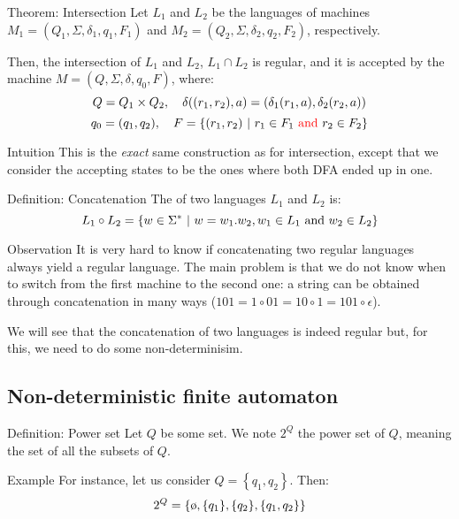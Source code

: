 \documentclass[a4paper]{article}
\begin{document}
\begin{parag}{Theorem: Intersection}
    Let $L_1$ and $L_2$ be the languages of machines $M_1 = \left(Q_1, \Sigma, \delta_1, q_1, F_1\right)$ and $M_2 = \left(Q_2, \Sigma, \delta_2, q_2, F_2\right)$, respectively.

    Then, the intersection of $L_1$ and $L_2$, $L_1 \cap L_2$ is regular, and it is accepted by the machine $M = \left(Q, \Sigma, \delta, q_0, F\right)$, where: 
    \[Q = Q_1 \times Q_2, \mathspace \delta\left(\left(r_1, r_2\right), a\right) = \left(\delta_1\left(r_1, a\right), \delta_2\left(r_2, a\right)\right) \]
    \[q_0 = \left(q_1, q_2\right), \mathspace F = \left\{\left(r_1, r_2\right) \suchthat r_1 \in F_1 \text{ \textcolor{red}{and} } r_2 \in F_2\right\}\]

    \begin{subparag}{Intuition}
        This is the \textit{exact} same construction as for intersection, except that we consider the accepting states to be the ones where both DFA ended up in one.
    \end{subparag}
\end{parag}

\begin{parag}{Definition: Concatenation}
    The  of two languages $L_1$ and $L_2$ is: 
    \[L_1 \circ L_2 = \left\{w \in\Sigma^* \suchthat w = w_1 . w_2, w_1 \in L_1 \text{ and } w_2 \in L_2\right\}\]
\end{parag}

\begin{parag}{Observation}
    It is very hard to know if concatenating two regular languages always yield a regular language. The main problem is that we do not know when to switch from the first machine to the second one: a string can be obtained through concatenation in many ways ($101 = 1 \circ 01 = 10 \circ 1 = 101 \circ \epsilon$).

    We will see that the concatenation of two languages is indeed regular but, for this, we need to do some non-determinisim.
\end{parag}

\subsection{Non-deterministic finite automaton}
\begin{parag}{Definition: Power set}
    Let $Q$ be some set. We note $2^Q$ the power set of $Q$, meaning the set of all the subsets of $Q$.

    \begin{subparag}{Example}
        For instance, let us consider $Q = \left\{q_1, q_2\right\}$. Then: 
        \[2^Q = \left\{\o, \left\{q_1\right\}, \left\{q_2\right\}, \left\{q_1, q_2\right\}\right\}\]
    \end{subparag}
\end{parag}
\end{document}
